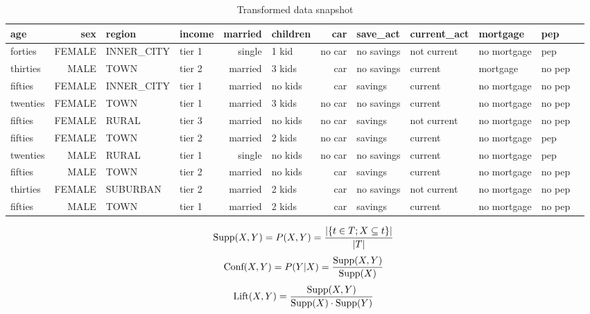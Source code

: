 \documentclass{article}
\begin{document}
\begin{table}
	\centering
	\begin{adjustbox}{width=\textwidth}
		\small
		\begin{tabular}{|l|r|l|l|r|l|r|l|l|l|l|l|}
			\hline
			age & sex & region & income & married & children & car & save\_act & current\_act & mortgage & pep\\\hline
			
			forties & FEMALE & INNER\_CITY & tier 1 & single & 1 kid & no car & no savings & not current & no mortgage & pep\\
			
			thirties & MALE & TOWN & tier 2 & married & 3 kids & car & no savings & current & mortgage & no pep\\
			
			fifties & FEMALE & INNER\_CITY & tier 1 & married & no kids & car & savings & current & no mortgage & no pep\\
			
			twenties & FEMALE & TOWN & tier 1 & married & 3 kids & no car & no savings & current & no mortgage & no pep\\
			
			fifties & FEMALE & RURAL & tier 3 & married & no kids & no car & savings & not current & no mortgage & no pep\\
			
			fifties & FEMALE & TOWN & tier 2 & married & 2 kids & no car & savings & current & no mortgage & pep\\
			
			twenties & MALE & RURAL & tier 1 & single & no kids & no car & no savings & current & no mortgage & pep\\
			
			fifties & MALE & TOWN & tier 2 & married & no kids & car & savings & current & no mortgage & no pep\\
			
			thirties & FEMALE & SUBURBAN & tier 2 & married & 2 kids & car & no savings & not current & no mortgage & no pep\\
			
			fifties & MALE & TOWN & tier 1 & married & 2 kids & car & savings & current & no mortgage & no pep\\\hline
		\end{tabular}
	\end{adjustbox}
	\caption{Transformed data snapshot}
\end{table}

$$\textnormal{Supp}(X,Y)=P(X,Y)=\frac{|\{t\in T; X\subseteq t\}|}{|T|}$$
$$\textnormal{Conf}(X,Y)=P(Y|X)=\frac{\textnormal{Supp}(X,Y)}{\textnormal{Supp}(X)}$$
$$\textnormal{Lift}(X,Y)=\frac{\textnormal{Supp}(X,Y)}{\textnormal{Supp}(X)\cdot\textnormal{Supp}(Y)}$$
\end{document}
